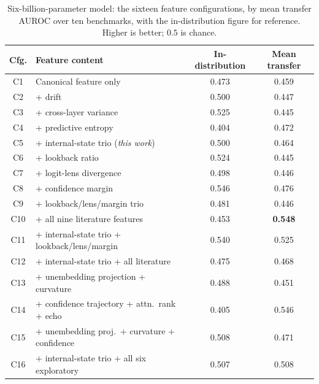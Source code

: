 \begin{table}[h]
\centering
\caption{Six-billion-parameter model: the sixteen feature configurations, by mean transfer
AUROC over ten benchmarks, with the in-distribution figure for reference. Higher is
better; $0.5$ is chance.}
\label{tab:gptj-configs}
\small
\renewcommand{\arraystretch}{1.15}
\begin{tabular}{cl c c}
\toprule
\textbf{Cfg.} & \textbf{Feature content} & \textbf{In-distribution} & \textbf{Mean transfer} \\
\midrule
C1  & Canonical feature only                       & 0.473 & 0.459 \\
C2  & + drift                                      & 0.500 & 0.447 \\
C3  & + cross-layer variance                       & 0.525 & 0.445 \\
C4  & + predictive entropy                         & 0.404 & 0.472 \\
C5  & + internal-state trio (\emph{this work})     & 0.500 & 0.464 \\
C6  & + lookback ratio                             & 0.524 & 0.445 \\
C7  & + logit-lens divergence                      & 0.498 & 0.446 \\
C8  & + confidence margin                          & 0.546 & 0.476 \\
C9  & + lookback/lens/margin trio                  & 0.481 & 0.446 \\
C10 & + all nine literature features               & 0.453 & \textbf{0.548} \\
C11 & + internal-state trio + lookback/lens/margin & 0.540 & 0.525 \\
C12 & + internal-state trio + all literature       & 0.475 & 0.468 \\
C13 & + unembedding projection + curvature         & 0.488 & 0.451 \\
C14 & + confidence trajectory + attn.\ rank + echo & 0.405 & 0.546 \\
C15 & + unembedding proj.\ + curvature + confidence & 0.508 & 0.471 \\
C16 & + internal-state trio + all six exploratory  & 0.507 & 0.508 \\
\bottomrule
\end{tabular}
\end{table}

